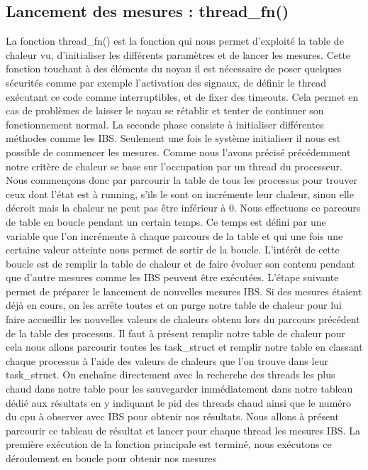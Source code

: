 \subsection{Lancement des mesures : thread\_fn()}
La fonction thread\_fn() est la fonction qui nous permet d'exploité la table de chaleur vu, d'initialiser
les différents paramètres et de lancer les mesures.
Cette fonction touchant à des éléments du noyau il est nécessaire de poser quelques sécurités comme par exemple l'activation des signaux, de définir le thread exécutant ce code comme interruptibles, et de fixer des timeouts. Cela permet en cas de problèmes de laisser le noyau se rétablir et tenter de continuer son fonctionnement normal.
La seconde phase consiste à initialiser différentes méthodes comme les IBS.
Seulement une fois le système initialiser il nous est possible de commencer les mesures.
Comme nous l'avons précisé précédemment notre critère de chaleur se base sur l'occupation par un thread du processeur. Nous commençons donc par parcourir la table de tous les processus pour trouver ceux dont l'état est à running, s'ils le sont on incrémente leur chaleur, sinon elle décroit mais la chaleur ne peut pas être inférieur à 0.
Nous effectuons ce parcours de table en boucle pendant un certain temps. Ce temps est défini par une variable que l'on incrémente à chaque parcours de la table et qui une fois une certaine valeur atteinte nous permet de sortir de la boucle. L’intérêt de cette boucle est de remplir la table de chaleur et de faire évoluer son contenu pendant que d'autre mesures comme les IBS peuvent être exécutées.
L'étape suivante permet de préparer le lancement de nouvelles mesures IBS. Si des mesures étaient déjà en cours, on les arrête toutes et on purge notre table de chaleur pour lui faire accueillir les nouvelles valeurs de chaleurs obtenu lors du parcours précédent de la table des processus.
Il faut à présent remplir notre table de chaleur pour cela nous allons parcourir toutes les task\_struct et remplir notre table en classant chaque processus à l'aide des valeurs de chaleurs que l'on trouve dans leur task\_struct. On enchaîne directement avec la recherche des threads les plus chaud dans notre table pour les sauvegarder immédiatement dans notre tableau dédié aux résultats en y indiquant le pid des threads chaud ainsi que le numéro du cpu à observer avec IBS pour obtenir nos résultats.
Nous allons à présent parcourir ce tableau de résultat et lancer pour chaque thread les mesures IBS.
La première exécution de la fonction principale est terminé, nous exécutons ce déroulement en boucle pour obtenir nos mesures
